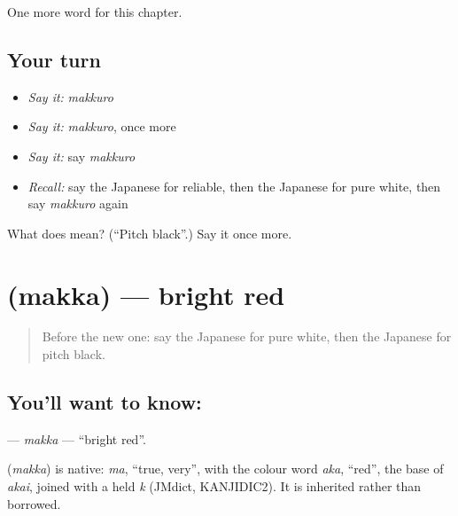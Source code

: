 \begin{grammarlens}[title={What you've built}]
One more word for this chapter.
\end{grammarlens}

\subsection*{Your turn}
\begin{itemize}
\raggedright
  \item \emph{Say it:} \emph{makkuro}
  \item \emph{Say it:} \emph{makkuro}, once more
  \item \emph{Say it:} say \emph{makkuro}
  \item \emph{Recall:} say the Japanese for reliable, then the Japanese for pure white, then say \emph{makkuro} again
\end{itemize}

\begin{tcolorbox}[breakable,colback=teal!4,colframe=teal!35!black,title={Before you move on}]
What does  mean? (\textquotedblleft{}Pitch black\textquotedblright{}.) Say it once more.
\end{tcolorbox}
\section[\texorpdfstring{\ja{まっか} (makka)}{まっか (makka)}]{ (makka) — bright red}

\label{lesson:JA-C130-makka}



\begin{quote}
Before the new one: say the Japanese for pure white, then the Japanese for pitch black.
\end{quote}

\subsection*{You'll want to know: }
\textbf{} — \emph{makka} — \textquotedblleft{}bright red\textquotedblright{}.

\begin{cousinweb}
\textbf{} (\emph{makka}) is native: \emph{ma}, \textquotedblleft{}true, very\textquotedblright{}, with the colour word \emph{aka}, \textquotedblleft{}red\textquotedblright{}, the base of \emph{akai}, joined with a held \emph{k} (JMdict, KANJIDIC2). It is inherited rather than borrowed.
\end{cousinweb}

